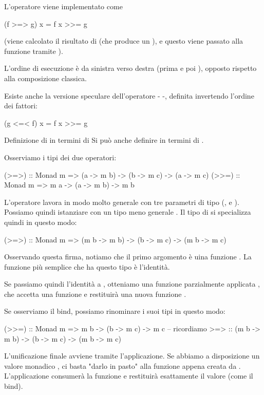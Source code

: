 L'operatore viene implementato come 
\begin{haskellbox}{}
(f >=> g) x = f x >>= g
\end{haskellbox}
(viene calcolato il risultato di  (che produce un ), e questo viene passato alla funzione  tramite \code{>>=}).

L'ordine di esecuzione è da sinistra verso destra (prima  e poi ), opposto rispetto alla composizione classica.

Esiste anche la versione speculare dell'operatore - \code{<=<} -, definita invertendo l'ordine dei fattori:
\begin{haskellbox}{}
(g <=< f) x = f x >>= g
\end{haskellbox}

\begin{gframe}{Definizione di \code{>>=} in termini di \code{>=>}}
Si può anche definire \code{>>=} in termini di \code{>=>}.

Osserviamo i tipi dei due operatori:
\begin{haskellbox}{}
(>=>) :: Monad m => (a -> m b) -> (b -> m c) -> (a -> m c)
(>>=) :: Monad m => m a -> (a -> m b) -> m b  
\end{haskellbox}

L'operatore \code{>=>} lavora in modo molto generale con tre parametri di tipo (,  e ). Possiamo quindi istanziare  con un tipo meno generale .
Il tipo di \code{>=>} si specializza quindi in questo modo:
\begin{haskellbox}{}
(>=>) :: Monad m => (m b -> m b) -> (b -> m c) -> (m b -> m c)
\end{haskellbox}

Osservando questa firma, notiamo che il primo argomento è uina funzione . La funzione più semplice che ha questo tipo è l'identità.

Se passiamo quindi l'identità a \code{>=>}, otteniamo una funzione parzialmente applicata , che accetta una funzione  e restituirà una nuova funzione .

Se osserviamo il bind, possiamo rinominare i suoi tipi in questo modo:
\begin{haskellbox}{}
(>>=) :: Monad m => m b -> (b -> m c) -> m c  
-- ricordiamo >=> :: (m b -> m b) -> (b -> m c) -> (m b -> m c)
\end{haskellbox}

L'unificazione finale avviene tramite l'applicazione. Se abbiamo a disposizione un valore monadico , ci basta "darlo in pasto" alla funzione appena creata da \code{>=>}. L'applicazione  consumerà la funzione e restituirà esattamente il valore  (come il bind). 


\end{gframe}
